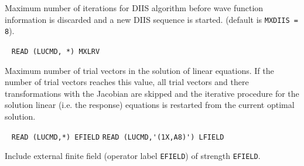 \begin{description}
  Maximum number of iterations for DIIS algorithm
  before wave function information is discarded and a new DIIS 
  sequence is started. 
  (default is \verb+MXDIIS = 8+).
 
\item[\Key{MXLRV}] \verb| |\newline
  \verb|READ (LUCMD, *) MXLRV|

  Maximum number of trial vectors in the solution of 
  linear equations. If the number of trial vectors reaches this
  value, all trial vectors and there transformations with the
  Jacobian are skipped and the iterative procedure for the solution
  linear (i.e. the response) equations is restarted from the current 
  optimal solution. 
 
\item[\Key{FIELD }] \verb| |\newline
    \verb|READ (LUCMD,*) EFIELD|\newline
    \verb|READ (LUCMD,'(1X,A8)') LFIELD|

    Include external finite field (operator label \verb+EFIELD+)
    of strength \verb+EFIELD+.
 

\end{description}
